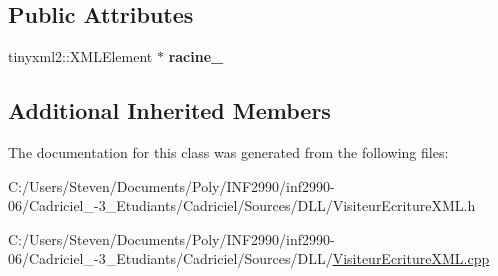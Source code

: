 \subsection*{Public Attributes}
\begin{DoxyCompactItemize}
\item 
\hypertarget{class_visiteur_ecriture_x_m_l_a40b822db4ca8fb0b9d9fa2801562ad03}{}\label{class_visiteur_ecriture_x_m_l_a40b822db4ca8fb0b9d9fa2801562ad03} 
tinyxml2\+::\+X\+M\+L\+Element $\ast$ {\bfseries racine\+\_\+}
\end{DoxyCompactItemize}
\subsection*{Additional Inherited Members}


The documentation for this class was generated from the following files\+:\begin{DoxyCompactItemize}
\item 
C\+:/\+Users/\+Steven/\+Documents/\+Poly/\+I\+N\+F2990/inf2990-\/06/\+Cadriciel\+\_-\/3\+\_\+\+Etudiants/\+Cadriciel/\+Sources/\+D\+L\+L/Visiteur\+Ecriture\+X\+M\+L.\+h\item 
C\+:/\+Users/\+Steven/\+Documents/\+Poly/\+I\+N\+F2990/inf2990-\/06/\+Cadriciel\+\_-\/3\+\_\+\+Etudiants/\+Cadriciel/\+Sources/\+D\+L\+L/\hyperlink{_visiteur_ecriture_x_m_l_8cpp}{Visiteur\+Ecriture\+X\+M\+L.\+cpp}\end{DoxyCompactItemize}
